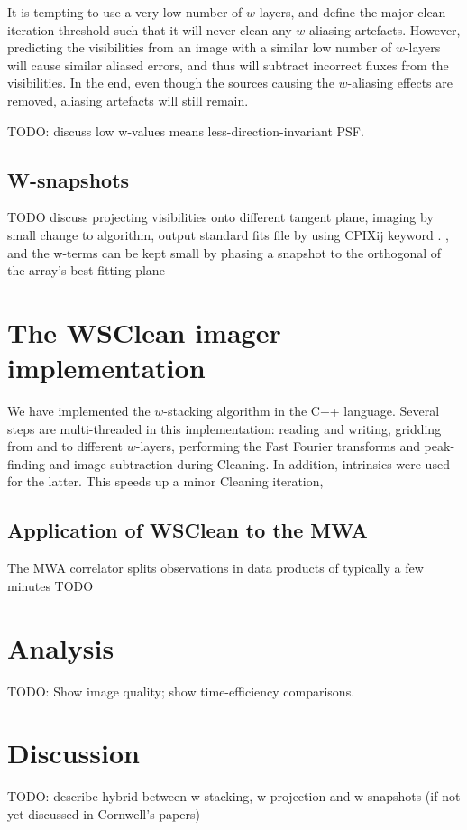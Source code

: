\documentclass[useAMS,usenatbib]{mn2e}
\begin{document}
It is tempting to use a very low number of $w$-layers, and define the major clean iteration threshold such that it will never clean any $w$-aliasing artefacts. However, predicting the visibilities from an image with a similar low number of $w$-layers will cause similar aliased errors, and thus will subtract incorrect fluxes from the visibilities. In the end, even though the sources causing the $w$-aliasing effects are removed, aliasing artefacts will still remain.

TODO: discuss low w-values means less-direction-invariant PSF.

\subsection{W-snapshots}
TODO discuss projecting visibilities onto different tangent plane, imaging by small change to algorithm, output standard fits file by using CPIXij keyword \citet{wcs-in-fits}.
, and the w-terms can be kept small by phasing a snapshot to the orthogonal of the array's best-fitting plane

\section{The WSClean imager implementation} \label{sec:implementation}
We have implemented the $w$-stacking algorithm in the C++ language. Several steps are multi-threaded in this implementation: reading and writing, gridding from and to different $w$-layers, performing the Fast Fourier transforms and peak-finding and image subtraction during Cleaning. In addition, intrinsics were used for the latter. This speeds up a minor Cleaning iteration, 

\subsection{Application of WSClean to the MWA}
The MWA correlator splits observations in data products of typically a few minutes
TODO

\section{Analysis} \label{sec:analysis}
TODO: Show image quality; show time-efficiency comparisons.

\section{Discussion} \label{sec:discussion}
TODO: describe hybrid between w-stacking, w-projection and w-snapshots (if not yet discussed in Cornwell's papers)
\end{document}
